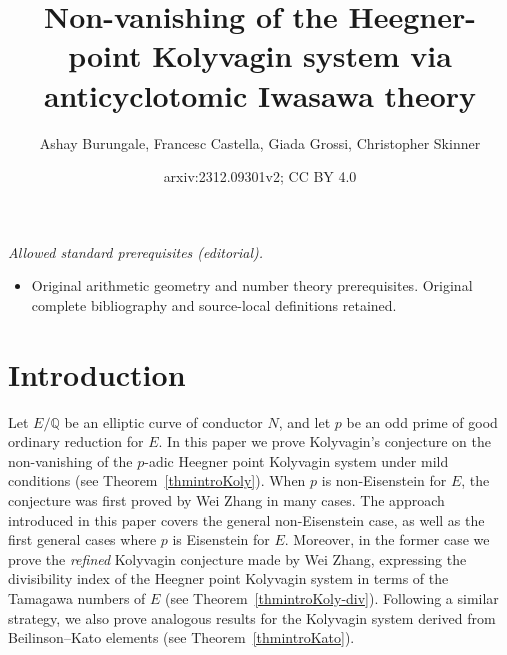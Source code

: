 \documentclass[10pt,reqno]{amsart}
\title{Non-vanishing of the Heegner-point Kolyvagin system via anticyclotomic Iwasawa theory}
\author{Ashay Burungale, Francesc Castella, Giada Grossi, Christopher Skinner}
\date{arxiv:2312.09301v2; CC BY 4.0}
\numberwithin{equation}{section}
\theoremstyle{plain}
\theoremstyle{definition}
\theoremstyle{definition}
\theoremstyle{plain}
\theoremstyle{plain}
\theoremstyle{plain}
\theoremstyle{plain}
\theoremstyle{plain}
\theoremstyle{plain}
\newcommand{\Q}{\mathbb{Q}}
\begin{document}
\maketitle
\noindent\textit{Allowed standard prerequisites (editorial).}\begin{itemize}
\item Original arithmetic geometry and number theory prerequisites. Original complete bibliography and source-local definitions retained.
\end{itemize}\medskip
\section*{Introduction}


Let $E/\Q$ be an elliptic curve of conductor $N$, and let $p$ be an odd prime of good ordinary reduction for $E$. In this paper we prove Kolyvagin's conjecture on the non-vanishing of the $p$-adic Heegner point Kolyvagin system under mild conditions (see Theorem~\ref{thmintroKoly}). When $p$ is non-Eisenstein for $E$, the conjecture was first proved by Wei Zhang in many cases. The approach introduced in this paper covers the general non-Eisenstein case, as well as the first general cases where $p$ is Eisenstein for $E$. Moreover, in the former case we 
prove the \emph{refined} Kolyvagin conjecture made by Wei Zhang, expressing the divisibility index of the Heegner point Kolyvagin system in terms of the Tamagawa numbers of $E$ (see Theorem~\ref{thmintroKoly-div}). 
Following a similar strategy, we also prove analogous  results %
for the Kolyvagin system derived from Beilinson--Kato elements (see Theorem~\ref{thmintroKato}). 


\end{document}
